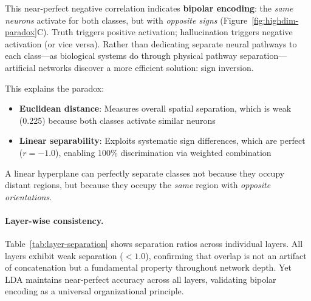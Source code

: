 \documentclass[11pt]{article}
\begin{document}
This near-perfect negative correlation indicates \textbf{bipolar encoding}: the \textit{same neurons} activate for both classes, but with \textit{opposite signs} (Figure~\ref{fig:highdim-paradox}C). Truth triggers positive activation; hallucination triggers negative activation (or vice versa). Rather than dedicating separate neural pathways to each class---as biological systems do through physical pathway separation---artificial networks discover a more efficient solution: sign inversion.

This explains the paradox:
\begin{itemize}
\item \textbf{Euclidean distance}: Measures overall spatial separation, which is weak (0.225) because both classes activate similar neurons
\item \textbf{Linear separability}: Exploits systematic sign differences, which are perfect ($r = -1.0$), enabling 100\% discrimination via weighted combination
\end{itemize}

A linear hyperplane can perfectly separate classes not because they occupy distant regions, but because they occupy the \textit{same} region with \textit{opposite orientations}.

\paragraph{Layer-wise consistency.}
Table~\ref{tab:layer-separation} shows separation ratios across individual layers. All layers exhibit weak separation ($< 1.0$), confirming that overlap is not an artifact of concatenation but a fundamental property throughout network depth. Yet LDA maintains near-perfect accuracy across all layers, validating bipolar encoding as a universal organizational principle.
\end{document}
